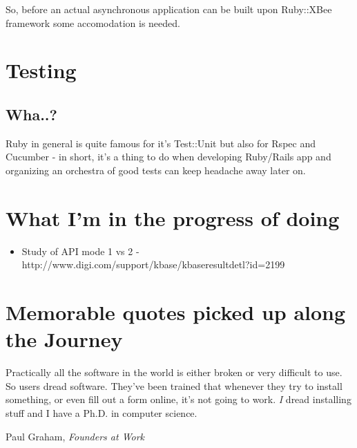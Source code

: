 \noindent So, before an actual asynchronous application can be built upon Ruby::XBee framework some accomodation is needed.

\section{Testing}
\subsection{Wha..?}
Ruby in general is quite famous for it's Test::Unit but also for Rspec and Cucumber - in short, it's a thing to do when developing Ruby/Rails app and organizing an orchestra of good tests can keep headache away later on.

\section{What I'm in the progress of doing}
\begin{itemize}
\item Study of API mode 1 vs 2 - http://www.digi.com/support/kbase/kbaseresultdetl?id=2199
\end{itemize}

\section{Memorable quotes picked up along the Journey}
\epigraph{Practically all the software in the world is either broken or very difficult to use. So users dread software. They've been trained that whenever they try to install something, or even fill out a form online, it's not going to work. \textit{I} dread installing stuff and I have a Ph.D. in computer science.}{Paul Graham, \textit{Founders at Work} \cite{rubytutorial}}